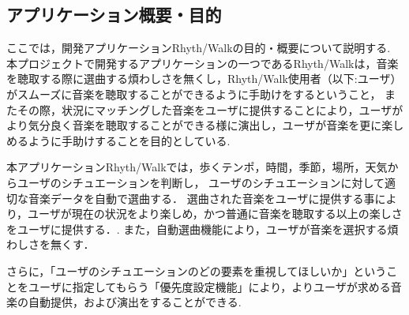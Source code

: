 \subsection{アプリケーション概要・目的}
\par
ここでは，開発アプリケーションRhyth/Walkの目的・概要について説明する.
本プロジェクトで開発するアプリケーションの一つであるRhyth/Walkは，音楽を聴取する際に選曲する煩わしさを無くし，Rhyth/Walk使用者（以下:ユーザ）がスムーズに音楽を聴取することができるように手助けをするということ，
またその際，状況にマッチングした音楽をユーザに提供することにより，ユーザがより気分良く音楽を聴取することができる様に演出し，ユーザが音楽を更に楽しめるように手助けすることを目的としている.
\par
本アプリケーションRhyth/Walkでは，歩くテンポ，時間，季節，場所，天気からユーザのシチュエーションを判断し，
ユーザのシチュエーションに対して適切な音楽データを自動で選曲する．
選曲された音楽をユーザに提供する事により，ユーザが現在の状況をより楽しめ，かつ普通に音楽を聴取する以上の楽しさをユーザに提供する．.
また，自動選曲機能により，ユーザが音楽を選択する煩わしさを無くす．
\par
さらに，「ユーザのシチュエーションのどの要素を重視してほしいか」ということをユーザに指定してもらう「優先度設定機能」により，よりユーザが求める音楽の自動提供，および演出をすることができる.
